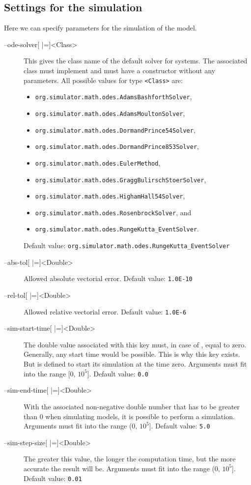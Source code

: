 \subsection{Settings for the simulation}
Here we can specify parameters for the simulation of the model.
\begin{description}
\item[--ode-solver{[} |={]}<Class>]
          This gives the class name of the default solver for \ODE
          systems. The associated class must
          implement \AbstractDESSolver and must have a constructor without
          any parameters.
          All possible values for type \texttt{<Class>} are:
          \begin{itemize}
          \item\texttt{org.simulator.math.odes.AdamsBashforthSolver},
          \item\texttt{org.simulator.math.odes.AdamsMoultonSolver},
          \item\texttt{org.simulator.math.odes.DormandPrince54Solver},
          \item\texttt{org.simulator.math.odes.DormandPrince853Solver},
          \item\texttt{org.simulator.math.odes.EulerMethod},
          \item\texttt{org.simulator.math.odes.GraggBulirschStoerSolver},
          \item\texttt{org.simulator.math.odes.HighamHall54Solver},
          \item\texttt{org.simulator.math.odes.RosenbrockSolver}, and
          \item\texttt{org.simulator.math.odes.RungeKutta\_EventSolver}.
          \end{itemize}
          Default value: \texttt{org.simulator.math.odes.RungeKutta\_EventSolver}
\item[--abs-tol{[} |={]}<Double>] Allowed absolute vectorial error.
          Default value: \texttt{1.0E-10}
\item[--rel-tol{[} |={]}<Double>] Allowed relative vectorial error.
          Default value: \texttt{1.0E-6}
\item[--sim-start-time{[} |={]}<Double>]
          The double value associated with this key must, in case of \SBML,
          equal to zero. Generally, any start time would be possible.
          This is why this key exists. But \SBML is defined to start its
          simulation at the time zero.
          Arguments must fit into the range {[}0, $10^5${]}.
          Default value: \texttt{0.0}
\item[--sim-end-time{[} |={]}<Double>]
          With the associated non-negative double number that has to be
          greater than 0 when simulating \SBML models, it is possible to
          perform a simulation.
          Arguments must fit into the range (0, $10^5${]}.
          Default value: \texttt{5.0}
\item[--sim-step-size{[} |={]}<Double>]
          The greater this value, the longer the computation time, but the
          more accurate the result will be.
          Arguments must fit into the range (0, $10^5${]}.
          Default value: \texttt{0.01}
\end{description}

